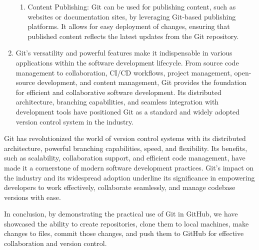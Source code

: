 \begin{enumerate}
\begin{enumerate}
        \item Content Publishing: Git can be used for publishing content, such as websites or documentation sites, by leveraging Git-based publishing platforms. It allows for easy deployment of changes, ensuring that published content reflects the latest updates from the Git repository.
    \end{enumerate}
    \item Git's versatility and powerful features make it indispensable in various applications within the software development lifecycle. From source code management to collaboration, CI/CD workflows, project management, open-source development, and content management, Git provides the foundation for efficient and collaborative software development. Its distributed architecture, branching capabilities, and seamless integration with development tools have positioned Git as a standard and widely adopted version control system in the industry.
\end{enumerate}


Git has revolutionized the world of version control systems with its distributed architecture, powerful branching capabilities, speed, and flexibility. Its benefits, such as scalability, collaboration support, and efficient code management, have made it a cornerstone of modern software development practices. Git's impact on the industry and its widespread adoption underline its significance in empowering developers to work effectively, collaborate seamlessly, and manage codebase versions with ease.



In conclusion, by demonstrating the practical use of Git in GitHub, we have showcased the ability to create repositories, clone them to local machines, make changes to files, commit those changes, and push them to GitHub for effective collaboration and version control.
